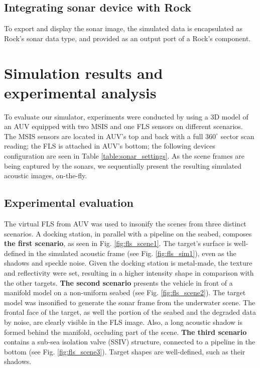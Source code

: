 \documentclass[final,5p,times]{elsarticle}
\begin{document}
\subsection{Integrating sonar device with Rock}
\label{dev:rock}

To export and display the sonar image, the simulated data is encapsulated as Rock's sonar data type, and provided as an output port of a Rock's component.


\section{Simulation results and experimental analysis}
\label{results}

To evaluate our simulator, experiments were conducted by using a 3D model of an AUV equipped with two MSIS and one FLS sensors on different scenarios. The MSIS sensors are located in AUV's top and back with a full $360^{\circ}$ sector scan reading; the FLS is attached in AUV's bottom; the following devices configuration are seen in Table \ref{table:sonar_settings}. As the scene frames are being captured by the sonars, we sequentially present the resulting simulated acoustic images, on-the-fly.

\subsection{Experimental evaluation}

The virtual FLS from AUV was used to insonify the scenes from three distinct scenarios. A docking station, in parallel with a pipeline on the seabed, composes \textbf{the first scenario}, as seen in Fig. \ref{fig:fls_scene1}. The target's surface is well-defined in the simulated acoustic frame (see Fig. \ref{fig:fls_sim1}), even as the shadows and speckle noise. Given the docking station is metal-made, the texture and reflectivity were set, resulting in a higher intensity shape in comparison with the other targets. \textbf{The second scenario} presents the vehicle in front of a manifold model on a non-uniform seabed (see Fig. \ref{fig:fls_scene2}). The target model was insonified to generate the sonar frame from the underwater scene. The frontal face of the target, as well the portion of the seabed and the degraded data by noise, are clearly visible in the FLS image. Also, a long acoustic shadow is formed behind the manifold, occluding part of the scene. \textbf{The third scenario} contains a sub-sea isolation valve (SSIV) structure, connected to a pipeline in the bottom (see Fig. \ref{fig:fls_scene3}). Target shapes are well-defined, such as their shadows.
\end{document}
